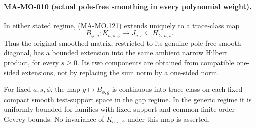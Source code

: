 \paragraph{MA-MO-010 (actual pole-free smoothing in every polynomial weight).}
In either stated regime, (MA-MO.121) extends uniquely to a
trace-class map
\[
             B_{\phi,g}:K_{a,s,\phi}\longrightarrow J_{a,s}
                    \subseteq H_{\Sigma,a,s}.
 \tag{MA-MO.123}
\]
Thus the original smoothed matrix, restricted to its genuine
pole-free smooth diagonal, has a bounded extension into the
same ambient narrow Hilbert product, for every \(s\ge0\).
Its two components are obtained from compatible one-sided
extensions, not by replacing the sum norm by a one-sided norm.

For fixed \(a,s,\phi\), the map \(g\mapsto B_{\phi,g}\)
is continuous into trace class on each fixed compact smooth
test-support space in the gap regime. In the generic regime
it is uniformly bounded for families with fixed support and
common finite-order Gevrey bounds. No invariance of
\(K_{a,s,\phi}\) under this map is asserted.

